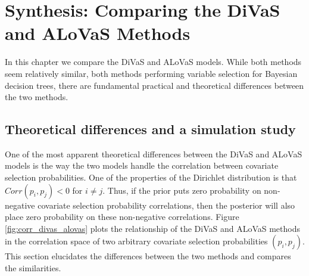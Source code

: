\chapter{Synthesis: Comparing the DiVaS and ALoVaS Methods}
In this chapter we compare the DiVaS and ALoVaS models. While both methods seem relatively similar, both methods performing variable selection for Bayesian decision trees, there are fundamental practical and theoretical differences between the two methods. 

\section{Theoretical differences and a simulation study}

One of the most apparent theoretical differences between the DiVaS and ALoVaS models is the way the two models handle the correlation between covariate selection probabilities. One of the properties of the Dirichlet distribution is that $Corr(p_i,p_j) < 0$ for $i\neq j$. Thus, if the prior puts zero probability on non-negative covariate selection probability correlations, then the posterior will also place zero probability on these non-negative correlations. Figure \ref{fig:corr_divas_alovas} plots the relationship of the DiVaS and ALoVaS methods in the correlation space of two arbitrary covariate selection probabilities $(p_i,p_j)$. This section elucidates the differences between the two methods and compares the similarities. 



